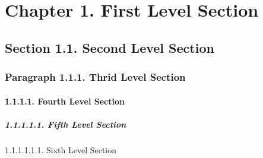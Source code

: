 \section{Chapter 1. First Level Section}\label{first-level-section}

\subsection{Section 1.1. Second Level
Section}\label{second-level-section}

\subsubsection{Paragraph 1.1.1. Thrid Level
Section}\label{thrid-level-section}

\paragraph{1.1.1.1. Fourth Level Section}\label{fourth-level-section}

\subparagraph{1.1.1.1.1. Fifth Level Section}\label{fifth-level-section}

1.1.1.1.1.1. Sixth Level Section
